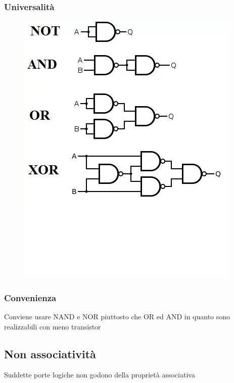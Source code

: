 \documentclass{report}
\begin{document}
        \subsubsection{Universalità}
            \begin{center}
                \begin{figure}[H]
                    \includegraphics[width=\textwidth]{completeness.png}
                \end{figure}
            \end{center}  
        \subsubsection{Convenienza}
            Conviene usare NAND e NOR piuttosto che OR ed AND in quanto sono
            realizzabili con meno transistor
        \subsection{Non associatività}
            Suddette porte logiche non godono della proprietà associativa     
\end{document}
